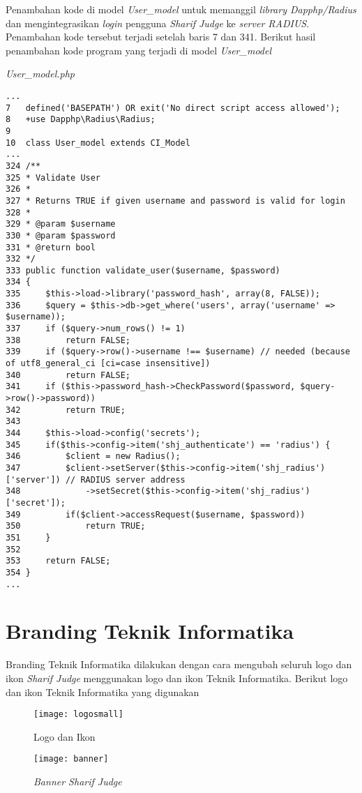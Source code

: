 Penambahan kode di model \textit{User\_model} untuk memanggil \textit{library Dapphp/Radius} dan mengintegrasikan \textit{login} pengguna \textit{Sharif Judge} ke \textit{server RADIUS}. Penambahan kode tersebut terjadi setelah baris 7 dan 341. Berikut hasil penambahan kode program yang terjadi di model \textit{User\_model}

\textit{User\_model.php}
\begin{lstlisting}[basicstyle=\ttfamily, frame=single,
columns=fullflexible, keepspaces=true, breaklines=true]
...
7	defined('BASEPATH') OR exit('No direct script access allowed');
8	+use Dapphp\Radius\Radius;
9
10	class User_model extends CI_Model
...
324	/**
325	* Validate User
326	*
327	* Returns TRUE if given username and password is valid for login
328	*
329	* @param $username
330	* @param $password
331	* @return bool
332	*/
333	public function validate_user($username, $password)
334	{
335		$this->load->library('password_hash', array(8, FALSE));
336		$query = $this->db->get_where('users', array('username' => $username));
337		if ($query->num_rows() != 1)
338			return FALSE;
339		if ($query->row()->username !== $username) // needed (because of utf8_general_ci [ci=case insensitive])
340			return FALSE;
341		if ($this->password_hash->CheckPassword($password, $query->row()->password))
342			return TRUE;
343
344		$this->load->config('secrets');
345		if($this->config->item('shj_authenticate') == 'radius') {
346			$client = new Radius();
347			$client->setServer($this->config->item('shj_radius')['server']) // RADIUS server address
348				->setSecret($this->config->item('shj_radius')['secret']);
349			if($client->accessRequest($username, $password))
350				return TRUE;
351		}
352		
353		return FALSE;
354	}
...
\end{lstlisting}

\section{Branding Teknik Informatika}
Branding Teknik Informatika dilakukan dengan cara mengubah seluruh logo dan ikon \textit{Sharif Judge} menggunakan logo dan ikon Teknik Informatika. Berikut logo dan ikon Teknik Informatika yang digunakan

\begin{figure}[H]
	\centering  
	\texttt{[image: logosmall]}  
	\caption[Logo dan Ikon]{Logo dan Ikon} 
	\label{fig:logosmall} 
\end{figure} 

\begin{figure}[H]
	\centering  
	\texttt{[image: banner]}  
	\caption[\textit{Banner Sharif Judge}]{\textit{Banner Sharif Judge}} 
	\label{fig:banner} 
\end{figure} 

